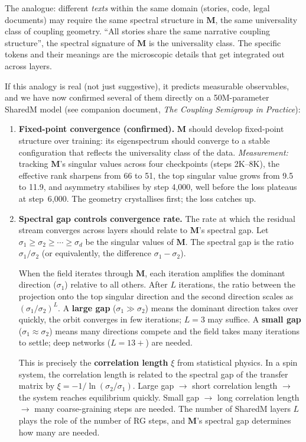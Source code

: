 \documentclass[11pt, a4paper]{article}
\newcommand{\M}{\mathbf{M}}
\theoremstyle{remark}
\begin{document}
The analogue: different \emph{texts} within the same domain (stories, code, legal documents) may require the same spectral structure in $\M$, the same universality class of coupling geometry.
``All stories share the same narrative coupling structure'', the spectral signature of $\M$ is the universality class.
The specific tokens and their meanings are the microscopic details that get integrated out across layers.

If this analogy is real (not just suggestive), it predicts measurable observables, and we have now confirmed several of them directly on a 50M-parameter SharedM model (see companion document, \textit{The Coupling Semigroup in Practice}):
\begin{enumerate}[nosep]
    \item \textbf{Fixed-point convergence (confirmed).}
    $\M$ should develop fixed-point structure over training: its eigenspectrum should converge to a stable configuration that reflects the universality class of the data.
    \textit{Measurement:} tracking $\M$'s singular values across four checkpoints (steps 2K--8K), the effective rank sharpens from 66 to 51, the top singular value grows from 9.5 to 11.9, and asymmetry stabilises by step 4{,}000, well before the loss plateaus at step~6{,}000.
    The geometry crystallises first; the loss catches up.

    \item \textbf{Spectral gap controls convergence rate.}
    The rate at which the residual stream converges across layers should relate to $\M$'s spectral gap.
    Let $\sigma_1 \geq \sigma_2 \geq \cdots \geq \sigma_d$ be the singular values of $\M$.
    The spectral gap is the ratio $\sigma_1 / \sigma_2$ (or equivalently, the difference $\sigma_1 - \sigma_2$).

    When the field iterates through $\M$, each iteration amplifies the dominant direction ($\sigma_1$) relative to all others.
    After $L$ iterations, the ratio between the projection onto the top singular direction and the second direction scales as $(\sigma_1 / \sigma_2)^L$.
    A \textbf{large gap} ($\sigma_1 \gg \sigma_2$) means the dominant direction takes over quickly, the orbit converges in few iterations; $L = 3$ may suffice.
    A \textbf{small gap} ($\sigma_1 \approx \sigma_2$) means many directions compete and the field takes many iterations to settle; deep networks ($L = 13{+}$) are needed.

    This is precisely the \textbf{correlation length} $\xi$ from statistical physics.
    In a spin system, the correlation length is related to the spectral gap of the transfer matrix by $\xi = -1 / \ln(\sigma_2 / \sigma_1)$.
    Large gap $\to$ short correlation length $\to$ the system reaches equilibrium quickly.
    Small gap $\to$ long correlation length $\to$ many coarse-graining steps are needed.
    The number of SharedM layers $L$ plays the role of the number of RG steps, and $\M$'s spectral gap determines how many are needed.


\end{enumerate}
\end{document}
